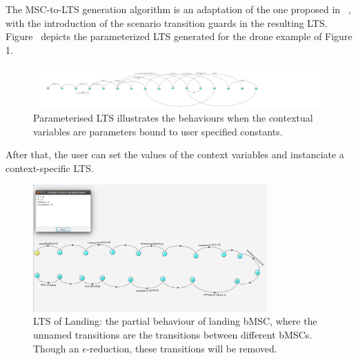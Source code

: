 The MSC-to-LTS generation algorithm is an adaptation of the one proposed in ~\cite{Rodrigues:2005}, with the introduction of the scenario transition guards in the resulting LTS. Figure~\cite{fig:pLTS} depicts the parameterized LTS generated for the drone example of Figure 1. 

\begin{figure}\centering
 \includegraphics[width=\textwidth]{figures/3-parameterized-LTS.png}
    \caption{Parameterised LTS illustrates the behaviours when the contextual variables are parameters bound to user specified constants. }
    \label{fig:pLTS}
    \vspace*{-0.25cm}
\end{figure}


After that, the user can set the values of the context variables and instanciate a context-specific LTS.

\begin{figure}\centering
 \includegraphics[width=0.8\textwidth]{figures/4-Land-final-LTS.png}
    \caption{LTS of Landing: the partial behaviour of landing bMSC, where the unnamed transitions are the transitions between different bMSCs. Though an $\epsilon$-reduction, these transitions will be removed.}
    \label{fig:landing}
    \vspace*{-0.25cm}
\end{figure}

